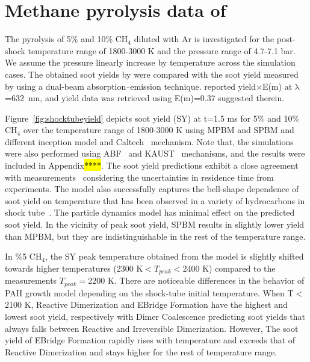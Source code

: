 \section{Methane pyrolysis data of \citet{agafonov2016unified}}

The pyrolysis of 5\% and 10\% $\mathrm{CH_4}$ diluted with Ar is investigated for the post-shock temperature range of 1800-3000 K and the pressure range of 4.7-7.1 bar. We assume the pressure linearly increase by temperature across the simulation cases. The obtained soot yields by were compared with the soot yield measured by \citet{agafonov2016unified} using a dual-beam absorption–emission technique. \citet{agafonov2016unified} reported yield$\times$E(m) at $\mathrm{\lambda}$=632~nm, and yield data was retrieved using E(m)=0.37 suggested therein. 






Figure~\ref{fig:shocktubeyield} depicts soot yield (SY) at t=1.5 ms for 5\% and 10\% $\mathrm{CH_4}$ over the temperature range of 1800-3000 K using MPBM and SPBM and different inception model and Caltech~\citep{blanquart2009chemical} mechanism. Note that, the simulations were also performed using ABF~\citep{appel2000kinetic} and KAUST~\cite{wang2013pah} mechanisms, and the results were included in Appendix\hl{****}. The soot yield predictions exhibit a close agreement with measurements~\citep{agafonov2016unified} considering the uncertainties in residence time from experiments. The model also successfully captures the bell-shape dependence of soot yield on temperature that has been observed in a variety of hydrocarbons in shock tube~\citep{kellerer1996soot,knorre1996soot}. The particle dynamics model has minimal effect on the predicted soot yield. In the vicinity of peak soot yield, SPBM results in slightly lower yield than MPBM, but they are indistinguishable in the rest of the temperature range. 

In \%5 $\mathrm{CH_4}$, the SY peak temperature obtained from the model is slightly shifted towards higher temperatures (2300 K$<T_{peak}<$2400 K) compared to the measurements $T_{peak}=$2200 K. There are noticeable differences in the behavior of PAH growth model depending on the shock-tube initial temperature. When T$<$2100 K, Reactive Dimerization and EBridge Formation have the highest and lowest soot yield, respectively with Dimer Coalescence predicting soot yields that always falls between Reactive and Irreversible Dimerization. However, The soot yield of EBridge Formation rapidly rises with temperature and exceeds that of Reactive Dimerization and stays higher for the rest of temperature range.

